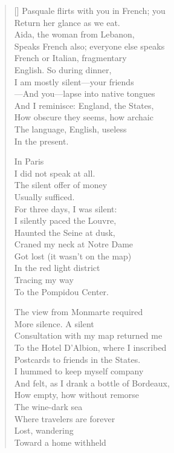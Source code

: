 \label{ch:venezia_mestre}
\settowidth{\versewidth}{As the vaporetto scuds across sequined canals.}
\begin{verse}[\versewidth]
Pasquale flirts with you in French; you\\
Return her glance as we eat.\\
Aida, the woman from Lebanon,\\
Speaks French also; everyone else speaks\\
French or Italian, fragmentary\\
English.  So during dinner,\\
I am mostly silent---your friends\\
---And you---lapse into native tongues\\
And I reminisce: England, the States,\\
How obscure they seems, how archaic\\
The language, English, useless\\
In the present.

\hspace*{3\vgap} In Paris\\
I did not speak at all.\\
The silent offer of money\\
Usually sufficed.\\
For three days, I was silent:\\
I silently paced the Louvre,\\
Haunted the Seine at dusk,\\
Craned my neck at Notre Dame\\
Got lost (it wasn't on the map)\\
In the red light district\\
Tracing my way\\
To the Pompidou Center.

The view from Monmarte required\\
More silence.   A silent\\
Consultation with my map returned me\\
To the Hotel D'Albion, where I inscribed\\
Postcards to friends in the States.\\
I hummed to keep myself company\\
And felt, as I drank a bottle of Bordeaux,\\
How empty, how without remorse\\
The wine-dark sea\\
Where travelers are forever\\
Lost, wandering\\
Toward a home withheld


\end{verse}
